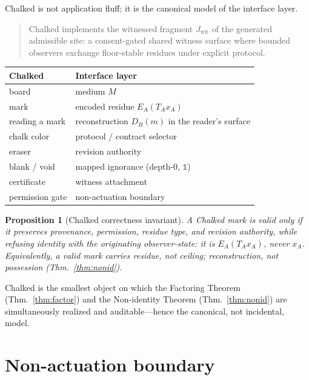 \documentclass[11pt]{article}
\newtheorem{proposition}{Proposition}
\theoremstyle{definition}
\theoremstyle{remark}
\newcommand{\Jwit}{J_{\mathrm{wit}}}
\begin{document}
Chalked is not application fluff; it is the canonical model of the interface layer.

\begin{quote}
Chalked implements the witnessed fragment $\Jwit$ of the generated admissible site: a consent-gated
shared witness surface where bounded observers exchange floor-stable residues under explicit protocol.
\end{quote}

\begin{center}
\renewcommand{\arraystretch}{1.2}
\begin{tabular}{@{}p{} p{}@{}}
\toprule
\textbf{Chalked} & \textbf{Interface layer} \\
\midrule
board & medium $M$ \\
mark & encoded residue $E_A(T_Ax_A)$ \\
reading a mark & reconstruction $D_B(m)$ in the reader's surface \\
chalk color & protocol / contract selector \\
eraser & revision authority \\
blank / void & mapped ignorance (depth-$0$, $\mathbb{1}$) \\
certificate & witness attachment \\
permission gate & non-actuation boundary \\
\bottomrule
\end{tabular}
\end{center}

\begin{proposition}[Chalked correctness invariant]\label{prop:chalked}
A Chalked mark is valid only if it preserves provenance, permission, residue type, and revision
authority, while refusing identity with the originating observer-state: it is $E_A(T_Ax_A)$, never
$x_A$. Equivalently, \emph{a valid mark carries residue, not ceiling; reconstruction, not possession}
(Thm.~\ref{thm:nonid}).
\end{proposition}

Chalked is the smallest object on which the Factoring Theorem (Thm.~\ref{thm:factor}) and the
Non-identity Theorem (Thm.~\ref{thm:nonid}) are simultaneously realized and auditable---hence the
canonical, not incidental, model.

\section{Non-actuation boundary}
\end{document}
